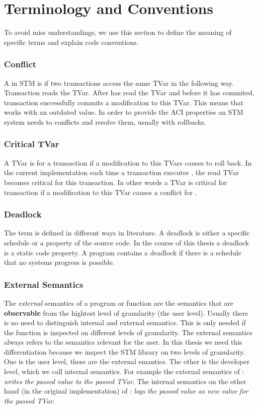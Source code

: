 \section{Terminology and Conventions}
\label{definitions}
To avoid miss understandings, we use this section to define the meaning of specific terms and explain code conventions.

\subsubsection{Conflict}
A  in STM is if two transactions access the same TVar in the following way. Transaction  reads 
the TVar. After  has read the TVar and before it has commited, transaction  successfully commits a modification 
to this TVar. This means that  works with an outdated value. In order to provide the ACI properties an STM system 
needs to  conflicts and resolve them, usually with rollbacks. 

\subsubsection{Critical TVar}
A TVar is  for a transaction  if a modification to this TVars causes  to roll back. In the current
implementation each time a transaction executes , the read TVar becomes critical for this transaction. 
In other words a TVar is critical for transaction  if a modification to this TVar causes a conflict for .

\subsubsection{Deadlock}
The term  is defined in different ways in literature. A deadlock is either a specific
schedule or a property of the source code. In the course of this thesis a deadlock
is a static code property. A program contains a deadlock if there is a schedule that no systems progress is
possible. 

\subsubsection{External Semantics}
The \textit{external} semantics of a program or function are the semantics that are \textbf{observable} from the 
hightest level of granularity (the user level). Usually there
is no need to distinguish internal and external semantics. This is only needed if the function is inspected on 
different levels of granularity. The external semantics always refers to the semantics relevant for the user.
In this thesis we need this differentiation because we inspect the STM library on two levels of granularity. 
One is the user level, these are the external emantics. The other is the developer level, which we call 
internal semantics. For example the external semantics of :
\textit{writes the passed value to the passed TVar}.
The internal semantics on the other hand (in the original implementation) of :
\textit{logs the passed value as new value for the passed TVar}.

